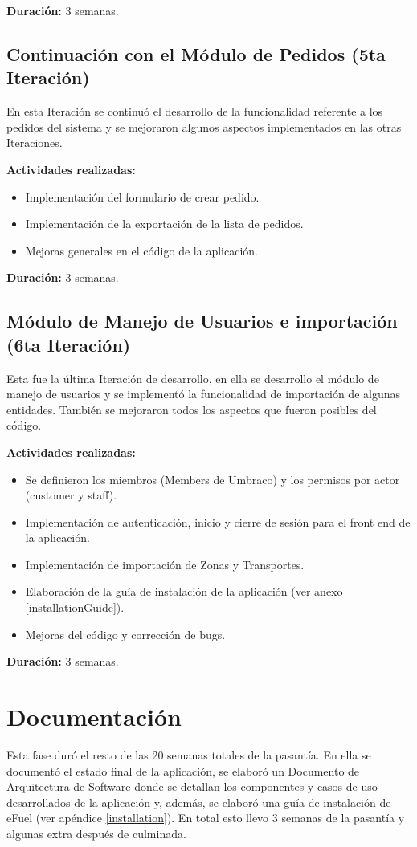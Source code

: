\textbf{Duración:} 3 semanas.

\subsection{Continuación con el Módulo de Pedidos (5ta Iteración)}
En esta Iteración se continuó el desarrollo de la funcionalidad referente a los pedidos del sistema y se mejoraron algunos aspectos implementados en las otras Iteraciones.

\textbf{Actividades realizadas:}
\begin{itemize}
    \item Implementación del formulario de crear pedido.
    \item Implementación de la exportación de la lista de pedidos.
    \item Mejoras generales en el código de la aplicación.
\end{itemize}

\textbf{Duración:} 3 semanas.

\subsection{Módulo de Manejo de Usuarios e importación (6ta Iteración)}
Esta fue la última Iteración de desarrollo, en ella se desarrollo el módulo de manejo de usuarios y se implementó la funcionalidad de importación de algunas entidades. También se mejoraron todos los aspectos que fueron posibles del código.

\textbf{Actividades realizadas:}
\begin{itemize}
    \item Se definieron los miembros (Members de Umbraco) y los permisos por actor (customer y staff).
    \item Implementación de autenticación, inicio y cierre de sesión para el front end de la aplicación.
    \item Implementación de importación de Zonas y Transportes.
    \item Elaboración de la guía de instalación de la aplicación (ver anexo \ref{installationGuide}).
    \item Mejoras del código y corrección de bugs.
\end{itemize}

\textbf{Duración:} 3 semanas.

\section{Documentación} \label{documentation}
Esta fase duró el resto de las 20 semanas totales de la pasantía. En ella se documentó el estado final de la aplicación, se elaboró un Documento de Arquitectura de Software donde se detallan los componentes y casos de uso desarrollados de la aplicación y, además, se elaboró una guía de instalación de eFuel (ver apéndice \ref{installation}). En total esto llevo 3 semanas de la pasantía y algunas extra después de culminada.
